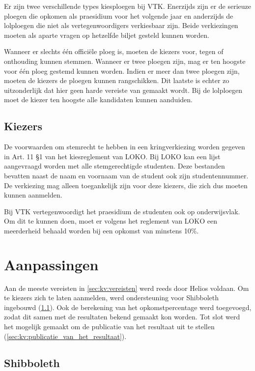 Er zijn twee verschillende types kiesploegen bij VTK. Enerzijds zijn er de serieuze ploegen die opkomen als praesidium voor het volgende jaar en anderzijds de lolploegen die niet als vertegenwoordigers verkiesbaar zijn. Beide verkiezingen moeten als aparte vragen op hetzelfde biljet gesteld kunnen worden.

\npar Wanneer er slechts \'e\'en offici\"ele ploeg is, moeten de kiezers voor, tegen of onthouding kunnen stemmen. Wanneer er twee ploegen zijn, mag er ten hoogste voor \'e\'en ploeg gestemd kunnen worden. Indien er meer dan twee ploegen zijn, moeten de kiezers de ploegen kunnen rangschikken. Dit laatste is echter zo uitzonderlijk dat hier geen harde vereiste van gemaakt wordt. Bij de lolploegen moet de kiezer ten hoogste alle kandidaten kunnen aanduiden.

\subsection{Kiezers}

De voorwaarden om stemrecht te hebben in een kringverkiezing worden gegeven in Art. 11 \S 1 van het kiesreglement van LOKO.\cite{loko_kiesreglement_verkiezingen} Bij LOKO kan een lijst aangevraagd worden met alle stemgerechtigde studenten. Deze bestanden bevatten naast de naam en voornaam van de student ook zijn studentennummer. De verkiezing mag alleen toegankelijk zijn voor deze kiezers, die zich dus moeten kunnen aanmelden.

\npar Bij VTK vertegenwoordigt het praesidium de studenten ook op onderwijsvlak. Om dit te kunnen doen, moet er volgens het reglement van LOKO een meerderheid behaald worden bij een opkomst van minstens 10\%.

\section{Aanpassingen}
\label{sec:kv:aanpassingen}

Aan de meeste vereisten in \ref{sec:kv:vereisten} werd reeds door Helios voldaan. Om te kiezers zich te laten aanmelden, werd ondersteuning voor Shibboleth ingebouwd (\ref{sec:kv:shibboleth}). Ook de berekening van het opkomstpercentage werd toegevoegd, zodat dit samen met de resultaten bekend gemaakt kon worden. Tot slot werd het mogelijk gemaakt om de publicatie van het resultaat uit te stellen (\ref{sec:kv:publicatie_van_het_resultaat}).

\subsection{Shibboleth}
\label{sec:kv:shibboleth}

